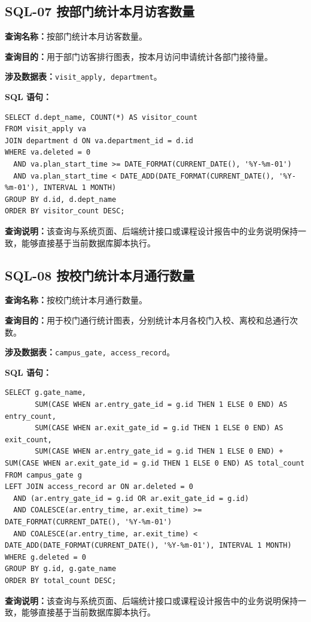 \subsection{SQL-07 按部门统计本月访客数量}
\textbf{查询名称：}按部门统计本月访客数量。\par
\textbf{查询目的：}用于部门访客排行图表，按本月访问申请统计各部门接待量。\par
\textbf{涉及数据表：}\texttt{visit\_apply, department}。\par
\textbf{SQL 语句：}
\begin{lstlisting}[style=sqlstyle]
SELECT d.dept_name, COUNT(*) AS visitor_count
FROM visit_apply va
JOIN department d ON va.department_id = d.id
WHERE va.deleted = 0
  AND va.plan_start_time >= DATE_FORMAT(CURRENT_DATE(), '%Y-%m-01')
  AND va.plan_start_time < DATE_ADD(DATE_FORMAT(CURRENT_DATE(), '%Y-%m-01'), INTERVAL 1 MONTH)
GROUP BY d.id, d.dept_name
ORDER BY visitor_count DESC;
\end{lstlisting}
\textbf{查询说明：}该查询与系统页面、后端统计接口或课程设计报告中的业务说明保持一致，能够直接基于当前数据库脚本执行。

\subsection{SQL-08 按校门统计本月通行数量}
\textbf{查询名称：}按校门统计本月通行数量。\par
\textbf{查询目的：}用于校门通行统计图表，分别统计本月各校门入校、离校和总通行次数。\par
\textbf{涉及数据表：}\texttt{campus\_gate, access\_record}。\par
\textbf{SQL 语句：}
\begin{lstlisting}[style=sqlstyle]
SELECT g.gate_name,
       SUM(CASE WHEN ar.entry_gate_id = g.id THEN 1 ELSE 0 END) AS entry_count,
       SUM(CASE WHEN ar.exit_gate_id = g.id THEN 1 ELSE 0 END) AS exit_count,
       SUM(CASE WHEN ar.entry_gate_id = g.id THEN 1 ELSE 0 END) + SUM(CASE WHEN ar.exit_gate_id = g.id THEN 1 ELSE 0 END) AS total_count
FROM campus_gate g
LEFT JOIN access_record ar ON ar.deleted = 0
  AND (ar.entry_gate_id = g.id OR ar.exit_gate_id = g.id)
  AND COALESCE(ar.entry_time, ar.exit_time) >= DATE_FORMAT(CURRENT_DATE(), '%Y-%m-01')
  AND COALESCE(ar.entry_time, ar.exit_time) < DATE_ADD(DATE_FORMAT(CURRENT_DATE(), '%Y-%m-01'), INTERVAL 1 MONTH)
WHERE g.deleted = 0
GROUP BY g.id, g.gate_name
ORDER BY total_count DESC;
\end{lstlisting}
\textbf{查询说明：}该查询与系统页面、后端统计接口或课程设计报告中的业务说明保持一致，能够直接基于当前数据库脚本执行。

